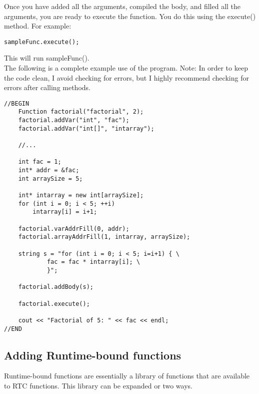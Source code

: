 \documentclass{article}
\begin{document}
\noindent
Once you have added all the arguments, compiled the body, and filled all the
arguments, you are ready to execute the function. You do this using the 
execute() method. For example:
{\ttfamily \begin{verbatim}
sampleFunc.execute();
\end{verbatim} }
\noindent
This will run sampleFunc(). \\

\noindent
The following is a complete example use of the program.
Note: In order to keep the code clean, I avoid checking for errors, but I
highly recommend checking for errors after calling methods.
{\ttfamily \begin{verbatim}
//BEGIN
	Function factorial("factorial", 2);
	factorial.addVar("int", "fac");
	factorial.addVar("int[]", "intarray");

	//...

	int fac = 1;
	int* addr = &fac;
	int arraySize = 5;

	int* intarray = new int[arraySize];
	for (int i = 0; i < 5; ++i)
	    intarray[i] = i+1;

	factorial.varAddrFill(0, addr);
	factorial.arrayAddrFill(1, intarray, arraySize);

	string s = "for (int i = 0; i < 5; i=i+1) { \
		 	fac = fac * intarray[i]; \
		    }"; 

	factorial.addBody(s);

	factorial.execute();

	cout << "Factorial of 5: " << fac << endl;
//END
\end{verbatim} }





\subsection{Adding Runtime-bound functions}

Runtime-bound functions are essentially a library of functions that are 
available to RTC functions. This library can be expanded or two ways. \\
\end{document}
